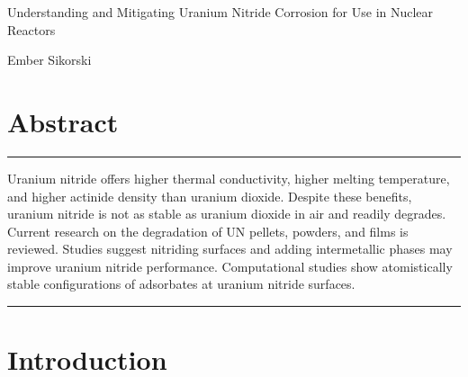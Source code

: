 \documentclass[11pt]{article}
\newcommand{\vs}{\vspace{2mm}}
\begin{document}
\begin{center}
Understanding and Mitigating Uranium Nitride Corrosion for Use in Nuclear Reactors \par \vs
Ember Sikorski 
\section*{Abstract}
\end{center}

\rule{6.2in}{0.1mm}
\vs \par 
Uranium nitride offers higher thermal conductivity, higher melting temperature, and higher actinide density than uranium dioxide. Despite these benefits, uranium nitride is not as stable as uranium dioxide in air and readily degrades. Current research on the degradation of UN pellets, powders, and films is reviewed. Studies suggest nitriding surfaces and adding intermetallic phases may improve uranium nitride performance. Computational studies show atomistically stable configurations of adsorbates at uranium nitride surfaces. \par 
\rule{6.2in}{0.1mm}	
\vs


\section{Introduction}
\end{document}
